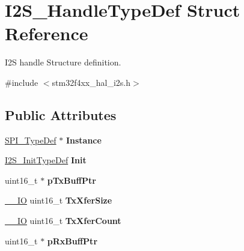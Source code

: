 \hypertarget{struct_i2_s___handle_type_def}{}\section{I2\+S\+\_\+\+Handle\+Type\+Def Struct Reference}
\label{struct_i2_s___handle_type_def}


I2S handle Structure definition.  




{\ttfamily \#include $<$stm32f4xx\+\_\+hal\+\_\+i2s.\+h$>$}

\subsection*{Public Attributes}
\begin{DoxyCompactItemize}
\item 
\hyperlink{struct_s_p_i___type_def}{S\+P\+I\+\_\+\+Type\+Def} $\ast$ {\bfseries Instance}\hypertarget{struct_i2_s___handle_type_def_a86f71902b413ffbf4a9b2a014fa328fd}{}\label{struct_i2_s___handle_type_def_a86f71902b413ffbf4a9b2a014fa328fd}

\item 
\hyperlink{struct_i2_s___init_type_def}{I2\+S\+\_\+\+Init\+Type\+Def} {\bfseries Init}\hypertarget{struct_i2_s___handle_type_def_a94aee46e69e63586302022cee25e3fef}{}\label{struct_i2_s___handle_type_def_a94aee46e69e63586302022cee25e3fef}

\item 
uint16\+\_\+t $\ast$ {\bfseries p\+Tx\+Buff\+Ptr}\hypertarget{struct_i2_s___handle_type_def_ac370d323d613caef9bea64b1f693e3a3}{}\label{struct_i2_s___handle_type_def_ac370d323d613caef9bea64b1f693e3a3}

\item 
\hyperlink{core__sc300_8h_aec43007d9998a0a0e01faede4133d6be}{\+\_\+\+\_\+\+IO} uint16\+\_\+t {\bfseries Tx\+Xfer\+Size}\hypertarget{struct_i2_s___handle_type_def_a2ef37085c2e8e7c4e403691b839ea057}{}\label{struct_i2_s___handle_type_def_a2ef37085c2e8e7c4e403691b839ea057}

\item 
\hyperlink{core__sc300_8h_aec43007d9998a0a0e01faede4133d6be}{\+\_\+\+\_\+\+IO} uint16\+\_\+t {\bfseries Tx\+Xfer\+Count}\hypertarget{struct_i2_s___handle_type_def_ae4c011efd61b97336cc6ad26a9c0f46c}{}\label{struct_i2_s___handle_type_def_ae4c011efd61b97336cc6ad26a9c0f46c}

\item 
uint16\+\_\+t $\ast$ {\bfseries p\+Rx\+Buff\+Ptr}\hypertarget{struct_i2_s___handle_type_def_a4ed533f6151dffe421f5a4b993245143}{}\label{struct_i2_s___handle_type_def_a4ed533f6151dffe421f5a4b993245143}


\end{DoxyCompactItemize}
